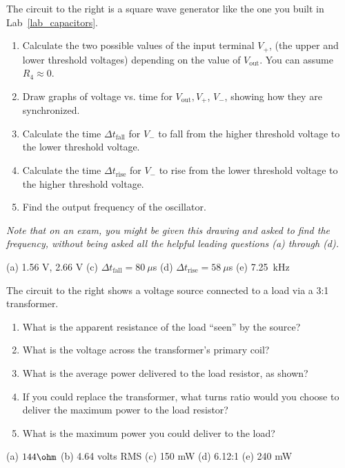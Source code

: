 \begin{Exercise}
The circuit to the right is a square wave generator like the one you built in Lab~\ref{lab_capacitors}.

 {
	\begin{enumerate}[label=(\alph*),wide]
	\item Calculate the two possible values of the input terminal $V_+$, (the upper and lower threshold voltages) depending on the value of $V_\text{out}$.  You can assume $R_4 \approx 0$. 
	\item Draw graphs of voltage vs. time for $V_\text{out}, V_+$,  $V_-$, showing how they are synchronized.  
	\item Calculate the time $\Delta t_\text{fall}$ for $V_-$ to fall from the higher threshold voltage to the lower threshold voltage.  
	\item Calculate the time $\Delta t_\text{rise}$ for $V_-$ to rise from the lower threshold voltage to the higher threshold voltage.  
	\item Find the output frequency of the oscillator.  
	\end{enumerate}
}

\medskip
\textit{Note that on an exam, you might be given this drawing and asked to find the frequency, without being asked all the helpful leading questions (a) through (d).}
\end{Exercise}
\begin{Answer}
(a) 1.56 V, 2.66 V (c) $\Delta t_\text{fall} = 80~\mu$s  (d) $\Delta t_\text{rise} = 58~\mu$s (e) 7.25~kHz
\end{Answer}

\begin{Exercise}
The circuit to the right shows a voltage source connected to a load via a 3:1 transformer. 

 {
	\begin{enumerate}[label=(\alph*),wide]
	\item What is the apparent resistance of the load ``seen'' by the source?
	\item What is the voltage across the transformer's primary coil?
	\item What is the average power delivered to the load resistor, as shown?
	\item If you could replace the transformer, what turns ratio would you choose to deliver the maximum power to the load resistor?
	\item What is the maximum power you could deliver to the load? 
	\end{enumerate}
}
\end{Exercise}
\begin{Answer}
(a) $144\ohm$ (b) 4.64 volts RMS (c) 150 mW (d) 6.12:1 (e) 240 mW 
\end{Answer}


